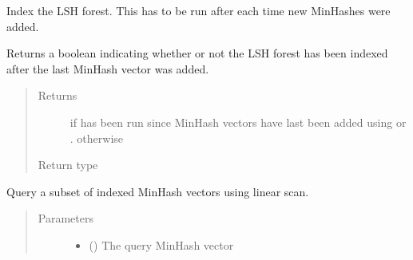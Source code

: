 \documentclass[letterpaper,10pt,english]{sphinxmanual}
\begin{document}
\begin{fulllineitems}
\begin{fulllineitems}
\label{\detokenize{documentation:tmap.LSHForest.index}}
Index the LSH forest. This has to be run after each time new MinHashes were added.

\end{fulllineitems}


\begin{fulllineitems}
\label{\detokenize{documentation:tmap.LSHForest.is_clean}}
Returns a boolean indicating whether or not the LSH forest has been indexed after the last MinHash vector was added.
\begin{quote}\begin{description}
\item[{Returns}] \leavevmode
{} if {\hyperref[\detokenize{documentation:tmap.LSHForest.index}]{}} has been run since MinHash vectors have last been added using {\hyperref[\detokenize{documentation:tmap.LSHForest.add}]{}} or {\hyperref[\detokenize{documentation:tmap.LSHForest.batch_add}]{}}.  otherwise

\item[{Return type}] \leavevmode
{}

\end{description}\end{quote}

\end{fulllineitems}


\begin{fulllineitems}
\label{\detokenize{documentation:tmap.LSHForest.linear_scan}}
Query a subset of indexed MinHash vectors using linear scan.
\begin{quote}\begin{description}
\item[{Parameters}] \leavevmode\begin{itemize}
\item {} 
 () \textendash{} The query MinHash vector


\end{itemize}
\end{description}
\end{quote}
\end{fulllineitems}
\end{fulllineitems}
\end{document}
